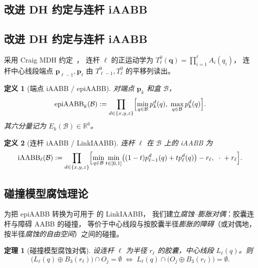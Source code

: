 \documentclass[journal]{IEEEtran}
\newtheorem{theorem}{定理}
\newtheorem{definition}{定义}
\newcommand{\iAABB}{\mathrm{iAABB}}
\newcommand{\Real}{\mathbb{R}}
\begin{document}
\subsection{改进 DH 约定与连杆 iAABB}

\subsection{改进 DH 约定与连杆 iAABB}
\label{sec:dh}

采用 Craig MDH 约定~\cite{craig2005introduction}，
连杆 $\ell$ 的正运动学为
$T_\ell^0(\mathbf{q}) = \prod_{i=1}^{\ell} A_i(q_i)$，
连杆中心线段端点 $\bm{p}_{\ell-1},\bm{p}_\ell$ 由
$T_{\ell-1}^0,T_\ell^0$ 的平移列读出。

\begin{definition}[端点 iAABB / epiAABB]\label{def:epiaabb}
对端点 $\bm{p}_k$ 和盒 $\mathcal{B}$，
\begin{equation}
\mathrm{epiAABB}_k(\mathcal{B})
:=\prod_{d\in\{x,y,z\}}
\Bigl[\min_{q\in\mathcal{B}} p_k^d(q),\;
\max_{q\in\mathcal{B}} p_k^d(q)\Bigr].
\end{equation}
其六分量记为 $E_k(\mathcal{B})\in\Real^6$。
\end{definition}

\begin{definition}[连杆 iAABB / LinkIAABB]\label{def:iaabb}
连杆 $\ell$ 在 $\mathcal{B}$ 上的 iAABB 为
\begin{equation}\label{eq:linkiaabb_def}
\iAABB_\ell(\mathcal{B})
:=\prod_{d\in\{x,y,z\}}
\Bigl[\min_{q\in\mathcal{B}}\min_{t\in[0,1]}
\bigl((1-t)p_{\ell-1}^d(q)+tp_\ell^d(q)\bigr) - r_\ell,\;
\;\cdot\;+r_\ell\Bigr].
\end{equation}
\end{definition}

\subsection{碰撞模型腐蚀理论}\label{sec:erosion}

为把 epiAABB 转换为可用于  的 LinkIAABB，
我们建立\emph{腐蚀--膨胀对偶}：胶囊连杆与障碍 AABB 的碰撞，
等价于中心线段与按胶囊半径\emph{膨胀的障碍}（或对偶地，按半径\emph{腐蚀的自由空间}）之间的碰撞。

\begin{theorem}[碰撞模型腐蚀对偶]\label{thm:erosion}
设连杆 $\ell$ 为半径 $r_\ell$ 的胶囊，中心线段 $L_\ell(q)$。则
\begin{equation}\label{eq:erosion}
\bigl(L_\ell(q)\oplus B_3(r_\ell)\bigr)\cap O_j=\emptyset
\;\Longleftrightarrow\;
L_\ell(q)\cap\bigl(O_j\oplus B_3(r_\ell)\bigr)=\emptyset.
\end{equation}
\end{theorem}
\end{document}
